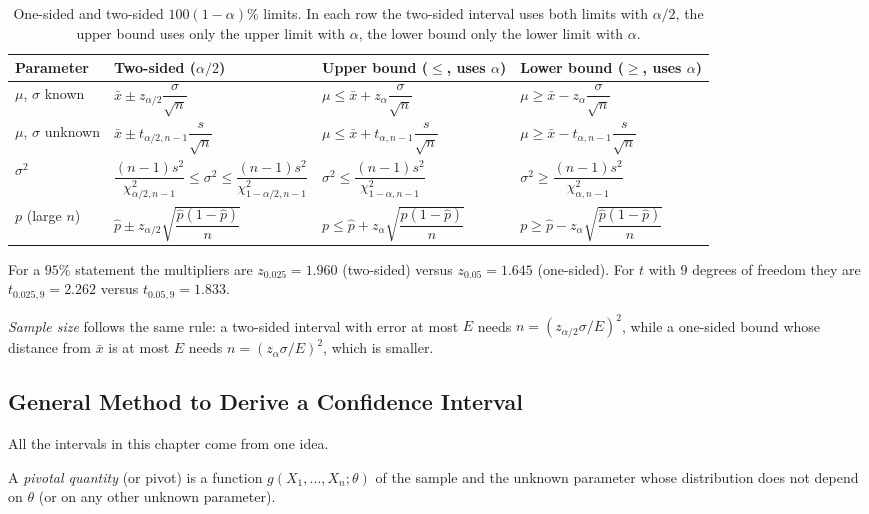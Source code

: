 \begin{table}
\caption{One-sided and two-sided $100(1-\alpha)\%$ limits. In each row the two-sided interval uses both limits with $\alpha/2$, the upper bound uses only the upper limit with $\alpha$, the lower bound only the lower limit with $\alpha$.}\label{tab:onetwo}
\centering\small
\begin{tabular}{p{2.6cm}p{3.6cm}p{3.9cm}p{3.9cm}}
\toprule
Parameter & Two-sided ($\alpha/2$) & Upper bound ($\le$, uses $\alpha$) & Lower bound ($\ge$, uses $\alpha$) \\
\midrule
$\mu$, $\sigma$ known & $\bar{x}\pm z_{\alpha/2}\dfrac{\sigma}{\sqrt n}$ & $\mu\le\bar{x}+z_\alpha\dfrac{\sigma}{\sqrt n}$ & $\mu\ge\bar{x}-z_\alpha\dfrac{\sigma}{\sqrt n}$ \\
$\mu$, $\sigma$ unknown & $\bar{x}\pm t_{\alpha/2,n-1}\dfrac{s}{\sqrt n}$ & $\mu\le\bar{x}+t_{\alpha,n-1}\dfrac{s}{\sqrt n}$ & $\mu\ge\bar{x}-t_{\alpha,n-1}\dfrac{s}{\sqrt n}$ \\
$\sigma^2$ & $\dfrac{(n-1)s^2}{\chi^2_{\alpha/2,n-1}}\le\sigma^2\le\dfrac{(n-1)s^2}{\chi^2_{1-\alpha/2,n-1}}$ & $\sigma^2\le\dfrac{(n-1)s^2}{\chi^2_{1-\alpha,n-1}}$ & $\sigma^2\ge\dfrac{(n-1)s^2}{\chi^2_{\alpha,n-1}}$ \\
$p$ (large $n$) & $\hat{p}\pm z_{\alpha/2}\sqrt{\dfrac{\hat{p}(1-\hat{p})}{n}}$ & $p\le\hat{p}+z_\alpha\sqrt{\dfrac{\hat{p}(1-\hat{p})}{n}}$ & $p\ge\hat{p}-z_\alpha\sqrt{\dfrac{\hat{p}(1-\hat{p})}{n}}$ \\
\bottomrule
\end{tabular}
\end{table}

For a $95\%$ statement the multipliers are $z_{0.025}=1.960$ (two-sided) versus $z_{0.05}=1.645$ (one-sided). For $t$ with $9$ degrees of freedom they are $t_{0.025,9}=2.262$ versus $t_{0.05,9}=1.833$.

\emph{Sample size} follows the same rule: a two-sided interval with error at most $E$ needs $n=(z_{\alpha/2}\sigma/E)^2$, while a one-sided bound whose distance from $\bar{x}$ is at most $E$ needs $n=(z_\alpha\sigma/E)^2$, which is smaller.

\subsection{General Method to Derive a Confidence Interval}

All the intervals in this chapter come from one idea.

\begin{definition}
A \emph{pivotal quantity} (or pivot) is a function $g(X_1,\dots,X_n;\theta)$ of the sample and the unknown parameter whose distribution does not depend on $\theta$ (or on any other unknown parameter).
\end{definition}

